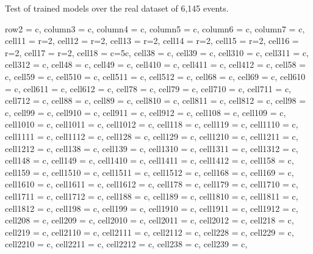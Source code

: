 \documentclass[journal]{IEEEtran}
\begin{document}
\begin{table}
\caption{Test of trained models over the real dataset of 6,145 events.}
\centering
\begin{adjustbox}{width=\textwidth}
\begin{tblr}{
  row{2} = {c},  column{3} = {c},  column{4} = {c},  column{5} = {c},
  column{6} = {c},  column{7} = {c},  cell{1}{1} = {r=2}{},  cell{1}{2} = {r=2}{},
  cell{1}{3} = {r=2}{},  cell{1}{4} = {r=2}{},  cell{1}{5} = {r=2}{},  cell{1}{6} = {r=2}{},
  cell{1}{7} = {r=2}{},  cell{1}{8} = {c=5}{c},  cell{3}{8} = {c},  cell{3}{9} = {c},
  cell{3}{10} = {c},  cell{3}{11} = {c},  cell{3}{12} = {c},  cell{4}{8} = {c},
  cell{4}{9} = {c},  cell{4}{10} = {c},  cell{4}{11} = {c},  cell{4}{12} = {c},
  cell{5}{8} = {c},  cell{5}{9} = {c},  cell{5}{10} = {c},  cell{5}{11} = {c},
  cell{5}{12} = {c},  cell{6}{8} = {c},  cell{6}{9} = {c},  cell{6}{10} = {c},
  cell{6}{11} = {c},  cell{6}{12} = {c},  cell{7}{8} = {c},  cell{7}{9} = {c},
  cell{7}{10} = {c},  cell{7}{11} = {c},  cell{7}{12} = {c},  cell{8}{8} = {c},
  cell{8}{9} = {c},  cell{8}{10} = {c},  cell{8}{11} = {c},  cell{8}{12} = {c},
  cell{9}{8} = {c},  cell{9}{9} = {c},  cell{9}{10} = {c},  cell{9}{11} = {c},
  cell{9}{12} = {c},  cell{10}{8} = {c},  cell{10}{9} = {c},  cell{10}{10} = {c},
  cell{10}{11} = {c},  cell{10}{12} = {c},  cell{11}{8} = {c},  cell{11}{9} = {c},
  cell{11}{10} = {c},  cell{11}{11} = {c},  cell{11}{12} = {c},  cell{12}{8} = {c},
  cell{12}{9} = {c},  cell{12}{10} = {c},  cell{12}{11} = {c},  cell{12}{12} = {c},
  cell{13}{8} = {c},  cell{13}{9} = {c},  cell{13}{10} = {c},  cell{13}{11} = {c},
  cell{13}{12} = {c},  cell{14}{8} = {c},  cell{14}{9} = {c},  cell{14}{10} = {c},
  cell{14}{11} = {c},  cell{14}{12} = {c},  cell{15}{8} = {c},  cell{15}{9} = {c},
  cell{15}{10} = {c},  cell{15}{11} = {c},  cell{15}{12} = {c},  cell{16}{8} = {c},
  cell{16}{9} = {c},  cell{16}{10} = {c},  cell{16}{11} = {c},  cell{16}{12} = {c},
  cell{17}{8} = {c},  cell{17}{9} = {c},  cell{17}{10} = {c},  cell{17}{11} = {c},
  cell{17}{12} = {c},  cell{18}{8} = {c},  cell{18}{9} = {c},  cell{18}{10} = {c},
  cell{18}{11} = {c},  cell{18}{12} = {c},  cell{19}{8} = {c},  cell{19}{9} = {c},
  cell{19}{10} = {c},  cell{19}{11} = {c},  cell{19}{12} = {c},  cell{20}{8} = {c},
  cell{20}{9} = {c},  cell{20}{10} = {c},  cell{20}{11} = {c},  cell{20}{12} = {c},
  cell{21}{8} = {c},  cell{21}{9} = {c},  cell{21}{10} = {c},  cell{21}{11} = {c},
  cell{21}{12} = {c},  cell{22}{8} = {c},  cell{22}{9} = {c},  cell{22}{10} = {c},
  cell{22}{11} = {c},  cell{22}{12} = {c},  cell{23}{8} = {c},  cell{23}{9} = {c},
}
\end{tblr}
\end{adjustbox}
\end{table}
\end{document}
